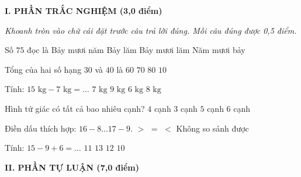 
\setcounter{ex}{0}
\setcounter{bt}{0}

\textbf{\large I. PHẦN TRẮC NGHIỆM (3,0 điểm)}

{\itshape Khoanh tròn vào chữ cái đặt trước câu trả lời đúng. Mỗi câu đúng được 0,5 điểm.}

\begin{ex} %
Số $75$ đọc là
\choice
{Bảy mươi năm}
{Bảy lăm}
{\True Bảy mươi lăm}
{Năm mươi bảy}
\end{ex}

\begin{ex} %
Tổng của hai số hạng $30$ và $40$ là
\choice
{$60$}
{\True $70$}
{$80$}
{$10$}
\end{ex}

\begin{ex} %
Tính: $15\text{ kg} - 7\text{ kg} = \dots$
\choice
{$7\text{ kg}$}
{$9\text{ kg}$}
{$6\text{ kg}$}
{\True $8\text{ kg}$}
\end{ex}

\begin{ex} %
Hình tứ giác có tất cả bao nhiêu cạnh?
\choice
{\True $4$ cạnh}
{$3$ cạnh}
{$5$ cạnh}
{$6$ cạnh}
\end{ex}

\begin{ex} %
Điền dấu thích hợp: $16 - 8 \dots 17 - 9$.
\choice
{$>$}
{\True $=$}
{$<$}
{Không so sánh được}
\end{ex}

\begin{ex} %
Tính: $15 - 9 + 6 = \dots$
\choice
{$11$}
{$13$}
{\True $12$}
{$10$}
\end{ex}

\vspace{4mm}
\textbf{\large II. PHẦN TỰ LUẬN (7,0 điểm)}

